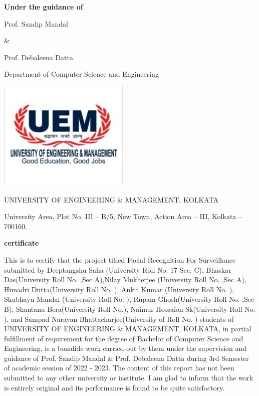 \documentclass[a4paper]{article}
\begin{document}
\begin{center}
\par \textbf{Under the guidance of} 
\par Prof. Sandip Mandal
\par \&
\par Prof. Debaleena Datta 
\par Department of Computer Science and Engineering
\end{center}
\begin{center}
\includegraphics[]{chota_uem.jpg}
\end{center}
\begin{center}
\par UNIVERSITY OF ENGINEERING \& MANAGEMENT, KOLKATA
\par University Area, Plot No. III – B/5, New Town, Action Area – III, Kolkata – 700160.
\end{center}
\clearpage
\begin{center}
\par \textbf{certificate} 
\par This is to certify that the project titled Facial Recognition For Surveillance submitted by Deeptangshu Saha (University Roll No. 17 Sec. C), Bhaskar Das(University Roll No. ,Sec A),Nilay Mukherjee (University Roll No. ,Sec A), Himadri Dutta(University Roll No. ), Ankit Kumar (University Roll No. ), Shubhayu Mandal (University Roll No. ), Rupam Ghosh(University Roll No. ,Sec B), Shantanu Bera(University Roll No.), Naimur Hossaion Sk(University Roll No. ), and Sampad Narayan Bhattacharjee(University of Roll No. ) students of UNIVERSITY OF ENGINEERING \& MANAGEMENT, KOLKATA, in partial fulfillment of requirement for the degree of Bachelor of Computer Science and Engineering, is a bonafide work carried out by them under the supervision and guidance of Prof. Sandip Mandal \& Prof. Debaleena Datta during 3rd Semester of academic session of 2022 - 2023. The content of this report has not been submitted to any other university or institute. I am glad to inform that the work is entirely original and its performance is found to be quite satisfactory.
\end{center}
\end{document}
